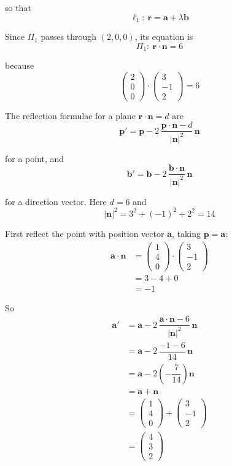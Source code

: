 \documentclass[leqno]{article}
\begin{document}
\begin{enumerate}[
  label=\textbf{\arabic*.},
  leftmargin=*,
  topsep=0pt,
  partopsep=0pt,
  parsep=0pt
]
\begin{djsSolution}
\begin{enumerate}[label=\textbf{(\alph*)}]
so that
\[
\ell_1:\ \mathbf r=\mathbf a+\lambda \mathbf b
\]

Since $\Pi_1$ passes through $(2,0,0)$, its equation is
\[
\Pi_1:\ \mathbf r\cdot \mathbf n=6
\]

because
\[
\begin{pmatrix}2\\0\\0\end{pmatrix}\cdot \begin{pmatrix}3\\-1\\2\end{pmatrix}=6
\]

The reflection formulae for a plane $\mathbf r\cdot \mathbf n=d$ are
\[
\mathbf p'
=
\mathbf p
-2\,\dfrac{\mathbf p\cdot\mathbf n-d}{|\mathbf n|^2}\,\mathbf n
\]

for a point, and
\[
\mathbf b'
=
\mathbf b
-2\,\dfrac{\mathbf b\cdot\mathbf n}{|\mathbf n|^2}\,\mathbf n
\]

for a direction vector. Here $d=6$ and
\[
|\mathbf n|^2=3^2+(-1)^2+2^2=14
\]

First reflect the point with position vector $\mathbf a$, taking $\mathbf p=\mathbf a$:
\begin{align*}
\mathbf a\cdot\mathbf n
&=
\begin{pmatrix}1\\4\\0\end{pmatrix}\cdot
\begin{pmatrix}3\\-1\\2\end{pmatrix}\\
&=3-4+0\\
&=-1
\end{align*}

So
\begin{align*}
\mathbf a'
&=
\mathbf a
-2\,\dfrac{\mathbf a\cdot\mathbf n-6}{|\mathbf n|^2}\,\mathbf n\\
&=
\mathbf a
-2\,\dfrac{-1-6}{14}\,\mathbf n\\
&=
\mathbf a
-2\left(-\dfrac{7}{14}\right)\mathbf n\\
&=
\mathbf a+\mathbf n\\
&=
\begin{pmatrix}1\\4\\0\end{pmatrix}
+
\begin{pmatrix}3\\-1\\2\end{pmatrix}\\
&=
\begin{pmatrix}4\\3\\2\end{pmatrix}
\end{align*}


\end{enumerate}
\end{djsSolution}
\end{enumerate}
\end{document}
